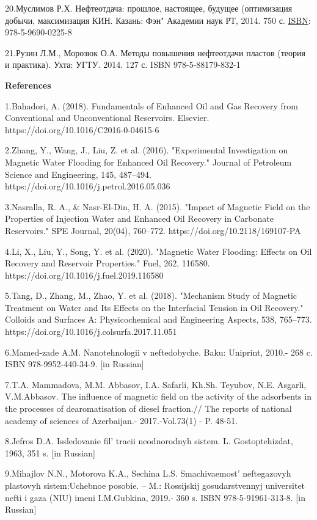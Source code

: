 20.Муслимов Р.Х. Нефтеотдача: прошлое, настоящее, будущее (оптимизация
добычи, максимизация КИН. Казань: Фэн" Академии наук РТ, 2014. 750 с.
\href{https://www.libex.ru/qna/ref/isbn/}{ISBN}: 978-5-9690-0225-8

21.Рузин Л.М., Морозюк О.А. Методы повышения нефтеотдачи пластов (теория
и практика). Ухта: УГТУ. 2014. 127 с. ISBN 978-5-88179-832-1

{\bfseries References}

1.Bahadori, A. (2018). Fundamentals of Enhanced Oil and Gas Recovery
from Conventional and Unconventional Reservoirs. Elsevier.
https://doi.org/10.1016/C2016-0-04615-6

2.Zhang, Y., Wang, J., Liu, Z. et al. (2016). "Experimental
Investigation on Magnetic Water Flooding for Enhanced Oil Recovery."
Journal of Petroleum Science and Engineering, 145, 487--494.
https://doi.org/10.1016/j.petrol.2016.05.036

3.Nasralla, R. A., \& Nasr-El-Din, H. A. (2015). "Impact of Magnetic
Field on the Properties of Injection Water and Enhanced Oil Recovery in
Carbonate Reservoirs." SPE Journal, 20(04), 760--772.
https://doi.org/10.2118/169107-PA

4.Li, X., Liu, Y., Song, Y. et al. (2020). "Magnetic Water Flooding:
Effects on Oil Recovery and Reservoir Properties." Fuel, 262, 116580.
https://doi.org/10.1016/j.fuel.2019.116580

5.Tang, D., Zhang, M., Zhao, Y. et al. (2018). "Mechanism Study of
Magnetic Treatment on Water and Its Effects on the Interfacial Tension
in Oil Recovery." Colloids and Surfaces A: Physicochemical and
Engineering Aspects, 538, 765--773.
https://doi.org/10.1016/j.colsurfa.2017.11.051

6.Mamed-zade A.M. Nanotehnologii v neftedobyche. Baku: Uniprint, 2010.-
268 c. ISBN 978-9952-440-34-9. {[}in Russian{]}

7.T.A. Mammadova, M.M. Abbasov, I.A. Safarli, Kh.Sh. Teyubov, N.E.
Asgarli, V.M.Abbasov. The influence of magnetic field on the activity of
the adsorbents in the processes of dearomatisation of diesel fraction.//
The reports of national academy of sciences of Azerbaijan.-
2017.-Vol.73(1) - P. 48-51.

8.Jefros D.A. Issledovanie fil' tracii neodnorodnyh
sistem. L. Gostoptehizdat, 1963, 351 s. {[}in Russian{]}

9.Mihajlov N.N., Motorova K.A., Sechina L.S.
Smachivaemost'{} neftegazovyh plastovyh sistem:Uchebnoe
posobie. -- M.: Rossijskij gosudarstvennyj universitet nefti i gaza
(NIU) imeni I.M.Gubkina, 2019.- 360 s. ISBN 978-5-91961-313-8. {[}in
Russian{]}

